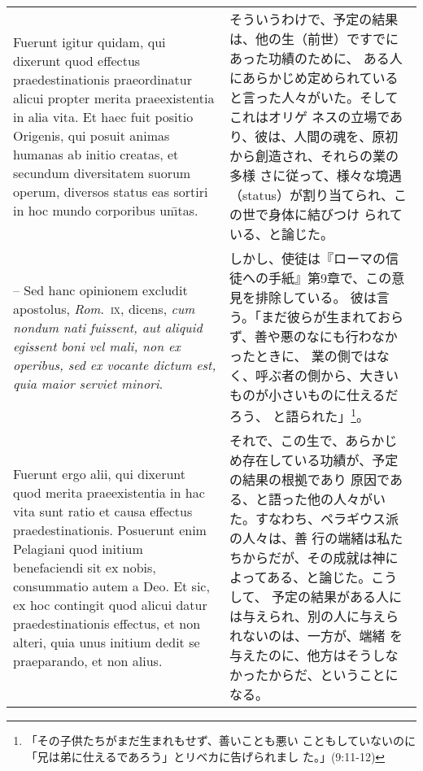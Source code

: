 \documentclass[10pt]{jsarticle} %
\begin{document}
\begin{longtable}{p{21em}p{21em}}
\\



Fuerunt igitur quidam, qui dixerunt quod effectus
praedestinationis praeordinatur alicui propter merita praeexistentia in
alia vita. Et haec fuit positio Origenis, qui posuit animas humanas ab
initio creatas, et secundum diversitatem suorum operum, diversos status
eas sortiri in hoc mundo corporibus un\={\i}tas. 



&

そういうわけで、予定の結果は、他の生（前世）ですでにあった功績のために、
ある人にあらかじめ定められていると言った人々がいた。そしてこれはオリゲ
ネスの立場であり、彼は、人間の魂を、原初から創造され、それらの業の多様
さに従って、様々な境遇（status）が割り当てられ、この世で身体に結びつけ
られている、と論じた。



\\



-- Sed hanc opinionem excludit
apostolus, {\itshape Rom}.~{\scshape ix}, dicens, {\itshape cum nondum nati fuissent, aut aliquid
egissent boni vel mali, non ex operibus, sed ex vocante dictum est, quia
maior serviet minori}. 


&

しかし、使徒は『ローマの信徒への手紙』第9章で、この意見を排除している。
彼は言う。「まだ彼らが生まれておらず、善や悪のなにも行わなかったときに、
業の側ではなく、呼ぶ者の側から、大きいものが小さいものに仕えるだろう、
と語られた」\footnote{「その子供たちがまだ生まれもせず、善いことも悪い
こともしていないのに「兄は弟に仕えるであろう」とリベカに告げられまし
た。」(9:11-12)}。


\\


Fuerunt ergo alii, qui dixerunt quod merita
praeexistentia in hac vita sunt ratio et causa effectus
praedestinationis. Posuerunt enim Pelagiani quod initium benefaciendi
sit ex nobis, consummatio autem a Deo. Et sic, ex hoc contingit quod
alicui datur praedestinationis effectus, et non alteri, quia unus
initium dedit se praeparando, et non alius. 


&

それで、この生で、あらかじめ存在している功績が、予定の結果の根拠であり
原因である、と語った他の人々がいた。すなわち、ペラギウス派の人々は、善
行の端緒は私たちからだが、その成就は神によってある、と論じた。こうして、
予定の結果がある人には与えられ、別の人に与えられないのは、一方が、端緒
を与えたのに、他方はそうしなかったからだ、ということになる。



\end{longtable}
\end{document}
